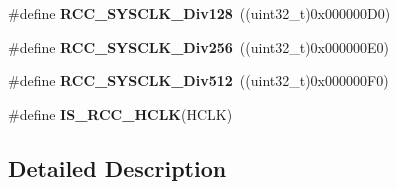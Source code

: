 \begin{DoxyCompactItemize}
\item 
\hypertarget{group___r_c_c___a_h_b___clock___source_ga1a28926fcb86112058a365e01fe9a46b}{\#define {\bfseries R\-C\-C\-\_\-\-S\-Y\-S\-C\-L\-K\-\_\-\-Div128}~((uint32\-\_\-t)0x000000\-D0)}\label{group___r_c_c___a_h_b___clock___source_ga1a28926fcb86112058a365e01fe9a46b}

\item 
\hypertarget{group___r_c_c___a_h_b___clock___source_gaa28bb876893b3267a813fc98a462d5ee}{\#define {\bfseries R\-C\-C\-\_\-\-S\-Y\-S\-C\-L\-K\-\_\-\-Div256}~((uint32\-\_\-t)0x000000\-E0)}\label{group___r_c_c___a_h_b___clock___source_gaa28bb876893b3267a813fc98a462d5ee}

\item 
\hypertarget{group___r_c_c___a_h_b___clock___source_gab5b4588c455d6327bc96f131ed6698ab}{\#define {\bfseries R\-C\-C\-\_\-\-S\-Y\-S\-C\-L\-K\-\_\-\-Div512}~((uint32\-\_\-t)0x000000\-F0)}\label{group___r_c_c___a_h_b___clock___source_gab5b4588c455d6327bc96f131ed6698ab}

\item 
\#define {\bfseries I\-S\-\_\-\-R\-C\-C\-\_\-\-H\-C\-L\-K}(H\-C\-L\-K)
\end{DoxyCompactItemize}


\subsection{Detailed Description}


